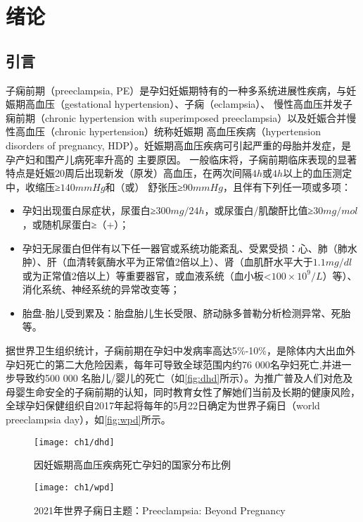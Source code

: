 \chapter{绪论}

\section{引言}
子痫前期（preeclampsia, PE）是孕妇妊娠期特有的一种多系统进展性疾病，与妊娠期高血压（gestational hypertension）、子痫（eclampsia）、
慢性高血压并发子痫前期（chronic hypertension with superimposed preeclampsia）以及妊娠合并慢性高血压（chronic hypertension）统称妊娠期
高血压疾病（hypertension disorders of pregnancy, HDP）\cite{OAG9}。妊娠期高血压疾病可引起严重的母胎并发症，是孕产妇和围产儿病死率升高的
主要原因\cite{OAG9}。
一般临床将，子痫前期临床表现的显著特点是妊娠20周后出现新发（原发）高血压，在两次间隔$4h$或$4h$以上的血压测定中，收缩压≥$140mmHg$和（或）
舒张压≥$90mmHg$，且伴有下列任一项或多项\cite{OAG9,FIGO}：
\begin{itemize}
    \item 孕妇出现蛋白尿症状，尿蛋白≥$300mg/24h$，或尿蛋白/肌酸酐比值≥$30mg/mol$，或随机尿蛋白≥（+）；
    \item 孕妇无尿蛋白但伴有以下任一器官或系统功能紊乱、受累受损：心、肺（肺水肿）、肝（血清转氨酶水平为正常值2倍以上）、肾（血肌酐水平大于$1.1mg/dl$
    或为正常值2倍以上）等重要器官，或血液系统（血小板<$100 \times 10^{9}/L$）等）、消化系统、神经系统的异常改变等；
    \item 胎盘-胎儿受到累及：胎盘胎儿生长受限、脐动脉多普勒分析检测异常、死胎等。 
\end{itemize}

据世界卫生组织统计\cite{LCT2006}，子痫前期在孕妇中发病率高达5\%-10\%，是除体内大出血外孕妇死亡的第二大危险因素，每年可导致全球范围内约76 000名孕妇死亡,并进一步导致约500 000
名胎儿/婴儿的死亡\cite{DAM2015,LCT2006}（如\autoref{fig:dhd}所示）。为推广普及人们对危及母婴生命安全的子痫前期的认知，同时教育女性了解她们当前及长期的健康风险，
全球孕妇保健组织自2017年起将每年的5月22日确定为世界子痫日（world preeclampsia day），如\autoref{fig:wpd}所示。
\begin{figure}[htbp]
    \centering
    \texttt{[image: ch1/dhd]}
    \caption{\label{fig:dhd}因妊娠期高血压疾病死亡孕妇的国家分布比例}
\end{figure}
\begin{figure}[htbp]
    \centering
    \texttt{[image: ch1/wpd]}
    \caption{\label{fig:wpd}2021年世界子痫日主题：Preeclampsia: Beyond Pregnancy}
\end{figure}

